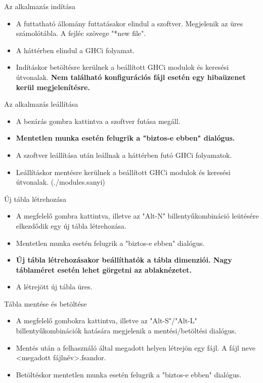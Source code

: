 \begin{compactenum}
	\item Az alkalmazás indítása
	\begin{itemize}
		\item A futtatható állomány futtatásakor elindul a szoftver. Megjelenik az üres számolótábla. A fejléc szövege "*new file".
		\item A háttérben elindul a GHCi folyamat.
		\item Indításkor betöltésre kerülnek a beállított GHCi modulok és keresési útvonalak. \textbf{Nem található konfigurációs fájl esetén egy hibaüzenet kerül megjelenítésre.}
	\end{itemize}
	\item Az alkalmazás leállítása
	\begin{itemize}
		\item A bezárás gombra kattintva a szoftver futása megáll.
		\item \textbf{Mentetlen munka esetén felugrik a "biztos-e ebben" dialógus.}
		\item A szoftver leállítása után leállnak a háttérben futó GHCi folyamatok.
		\item Leállításkor mentésre kerülnek a beállított GHCi modulok és keresési útvonalak. (./modules.sanyi)
	\end{itemize}
	\item Új tábla létrehozása
	\begin{itemize}
		\item A megfelelő gombra kattintva, illetve az "Alt-N" billentyűkombináció leütésére elkezdődik egy új tábla létrehozása.
		\item Mentetlen munka esetén felugrik a "biztos-e ebben" dialógus.
		\item \textbf{Új tábla létrehozásakor beállíthatók a tábla dimenziói. Nagy táblaméret esetén lehet görgetni az ablaknézetet.}
		\item A létrejött új tábla üres.
	\end{itemize}
	\item Tábla mentése és betöltése
	\begin{itemize}
		\item A megfelelő gombokra kattintva, illetve az "Alt-S"/"Alt-L" billentyűkombinációk hatására megjelenik a mentési/betöltési dialógus.
		\item Mentés után a felhasználó által megadott helyen létrejön egy fájl. A fájl neve <megadott fájlnév>.fsandor.
		\item Betöltéskor mentetlen munka esetén felugrik a "biztos-e ebben" dialógus.

\end{itemize}
\end{compactenum}
